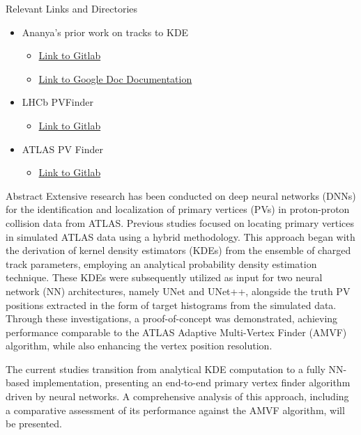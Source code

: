 \documentclass[xcolor=table,aspectratio=169]{beamer}
\begin{document}
\begin{frame}{Relevant Links and Directories}
    \begin{itemize}
        \item Ananya's prior work on tracks to KDE
        \begin{itemize}
            \item \href{https://github.com/qibinlei/TracksToKDE/tree/main}{Link to Gitlab}
            \item \href{https://docs.google.com/document/d/1oTlUo06nhkKBF059y9mCXGqZ46PPD3TuHFIe3EkTN-g/edit}{Link to Google Doc Documentation}
        \end{itemize}
        \item LHCb PVFinder
        \begin{itemize}
            \item \href{https://gitlab.cern.ch/sakar/pv-finder_v2/-/tree/master}{Link to Gitlab}
        \end{itemize}
        \item ATLAS PV Finder
        \begin{itemize}
            \item \href{https://gitlab.cern.ch/qlei/atlas_pvfinder}{Link to Gitlab}
        \end{itemize}
    \end{itemize}
\end{frame}

\begin{frame}{Abstract}
    Extensive research has been conducted on deep neural networks (DNNs) for the identification and localization of primary vertices (PVs) in proton-proton collision data from ATLAS. Previous studies focused on locating primary vertices in simulated ATLAS data using a hybrid methodology. This approach began with the derivation of kernel density estimators (KDEs) from the ensemble of charged track parameters, employing an analytical probability density estimation technique. These KDEs were subsequently utilized as input for two neural network (NN) architectures, namely UNet and UNet++, alongside the truth PV positions extracted in the form of target histograms from the simulated data. Through these investigations, a proof-of-concept was demonstrated, achieving performance comparable to the ATLAS Adaptive Multi-Vertex Finder (AMVF) algorithm, while also enhancing the vertex position resolution.

The current studies transition from analytical KDE computation to a fully NN-based implementation, presenting an end-to-end primary vertex finder algorithm driven by neural networks. A comprehensive analysis of this approach, including a comparative assessment of its performance against the AMVF algorithm, will be presented.
\end{frame}
\end{document}
